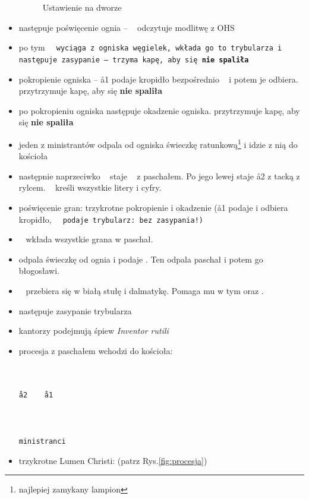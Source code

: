 \begin{itemize}
\begin{figure}[h]
		      \caption{Ustawienie na dworze}
		      \label{fig:ogien}
	      \end{figure}
	\item następuje poświęcenie ognia -- \ii~ odczytuje modlitwę z OHS
	\item po tym \tt~ wyciąga z ogniska węgielek, wkłada go to trybularza i
	      następuje zasypanie --  trzyma kapę, aby się \textbf{nie
		      spaliła}
	\item pokropienie ogniska -- \aa1 podaje kropidło bezpośrednio \ii~ i
	      potem je odbiera.  przytrzymuje kapę, aby się \textbf{nie
		      spaliła}
	\item po pokropieniu ogniska następuje okadzenie ogniska.  przytrzymuje
	      kapę, aby się \textbf{nie spaliła}
	\item jeden z ministrantów odpala od ogniska świeczkę
	      ratunkową\footnote{najlepiej zamykany lampion} i idzie z
	      nią do kościoła
	\item następnie naprzeciwko \ii~ staje \mm~ z paschałem. Po jego lewej staje
	      \aa2 z tacką z rylcem. \ii~ kreśli wszystkie litery i cyfry.
	\item poświęcenie gran: trzykrotne pokropienie i okadzenie (\aa1 podaje i
	      odbiera kropidło, \tt~ podaje trybularz: bez zasypania!)
	\item \ii~ wkłada wszystkie grana w paschał.
	\item {} odpala świeczkę od ognia i podaje \ii. Ten odpala paschał i potem
	      go błogosławi.
	\item \ii~ przebiera się w białą stułę i dalmatykę. Pomaga mu w tym 
	      oraz .
	\item następuje zasypanie trybularza
	\item kantorzy podejmują śpiew \textit{Inventor rutili}
	\item procesja z paschałem wchodzi do kościoła:
	      \begin{center}
		      \uparrow \smallskip\\
		      ~~~\tt \smallskip\\
		      \aa2~~~~\aa1 \smallskip\\
		      \ii \smallskip\\
		      ~~~ \smallskip\\
		      \mm \smallskip\\
		      ministranci
	      \end{center}
	\item trzykrotne Lumen Christi:  (patrz Rys.\ref{fig:procesja})

\end{itemize}
